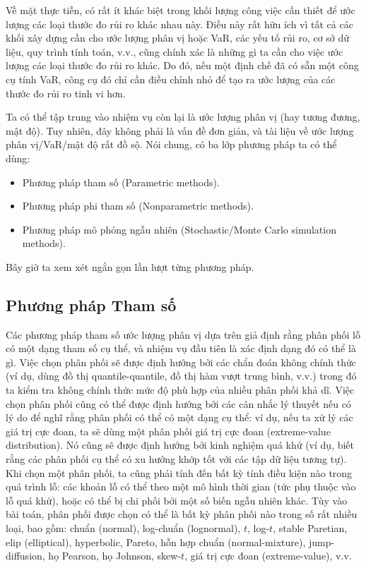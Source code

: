 Về mặt thực tiễn, có rất ít khác biệt trong khối lượng công việc cần thiết để ước lượng các loại thước đo rủi ro khác nhau này. Điều này rất hữu ích vì tất cả các khối xây dựng cần cho ước lượng phân vị hoặc VaR, các yếu tố rủi ro, cơ sở dữ liệu, quy trình tính toán, v.v., cũng chính xác là những gì ta cần cho việc ước lượng các loại thước đo rủi ro khác. Do đó, nếu một định chế đã có sẵn một công cụ tính VaR, công cụ đó chỉ cần điều chỉnh nhỏ để tạo ra ước lượng của các thước đo rủi ro tinh vi hơn.

Ta có thể tập trung vào nhiệm vụ còn lại là ước lượng phân vị (hay tương đương, mật độ). Tuy nhiên, đây không phải là vấn đề đơn giản, và tài liệu về ước lượng phân vị/VaR/mật độ rất đồ sộ. Nói chung, có ba lớp phương pháp ta có thể dùng:

\begin{itemize}
  \item Phương pháp tham số (Parametric methods).
  \item Phương pháp phi tham số (Nonparametric methods).
  \item Phương pháp mô phỏng ngẫu nhiên (Stochastic/Monte Carlo simulation methods).
\end{itemize}

Bây giờ ta xem xét ngắn gọn lần lượt từng phương pháp.

\subsection{Phương pháp Tham số}

Các phương pháp tham số ước lượng phân vị dựa trên giả định rằng phân phối lỗ có một dạng tham số cụ thể, và nhiệm vụ đầu tiên là xác định dạng đó có thể là gì. Việc chọn phân phối sẽ được định hướng bởi các chẩn đoán không chính thức (ví dụ, dùng đồ thị quantile-quantile, đồ thị hàm vượt trung bình, v.v.) trong đó ta kiểm tra không chính thức mức độ phù hợp của nhiều phân phối khả dĩ. Việc chọn phân phối cũng có thể được định hướng bởi các cân nhắc lý thuyết nếu có lý do để nghĩ rằng phân phối có thể có một dạng cụ thể: ví dụ, nếu ta xử lý các giá trị cực đoan, ta sẽ dùng một phân phối giá trị cực đoan (extreme-value distribution). Nó cũng sẽ được định hướng bởi kinh nghiệm quá khứ (ví dụ, biết rằng các phân phối cụ thể có xu hướng khớp tốt với các tập dữ liệu tương tự). Khi chọn một phân phối, ta cũng phải tính đến bất kỳ tính điều kiện nào trong quá trình lỗ: các khoản lỗ có thể theo một mô hình thời gian (tức phụ thuộc vào lỗ quá khứ), hoặc có thể bị chi phối bởi một số biến ngẫu nhiên khác. Tùy vào bài toán, phân phối được chọn có thể là bất kỳ phân phối nào trong số rất nhiều loại, bao gồm: chuẩn (normal), log-chuẩn (lognormal), $t$, log-$t$, stable Paretian, elip (elliptical), hyperbolic, Pareto, hỗn hợp chuẩn (normal-mixture), jump-diffusion, họ Pearson, họ Johnson, skew-$t$, giá trị cực đoan (extreme-value), v.v.

